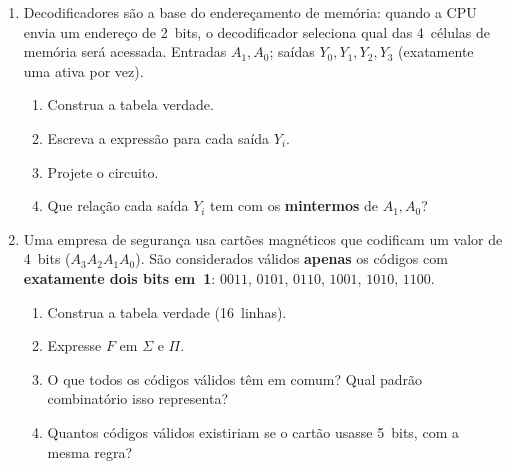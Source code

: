 \documentclass[11pt, a4paper]{article}
\begin{document}
\begin{enumerate}
\item Decodificadores s\~{a}o a base do endere\c{c}amento de mem\'{o}ria: quando a CPU envia um endere\c{c}o de 2~bits, o decodificador seleciona qual das 4~c\'{e}lulas de mem\'{o}ria ser\'{a} acessada. Entradas $A_1, A_0$; sa\'{i}das $Y_0, Y_1, Y_2, Y_3$ (exatamente uma ativa por vez).
\begin{enumerate}
  \item Construa a tabela verdade.
  \item Escreva a express\~{a}o para cada sa\'{i}da $Y_i$.
  \item Projete o circuito.
  \item Que rela\c{c}\~{a}o cada sa\'{i}da $Y_i$ tem com os \textbf{mintermos} de $A_1, A_0$?
\end{enumerate}

\item Uma empresa de seguran\c{c}a usa cart\~{o}es magn\'{e}ticos que codificam um valor de 4~bits ($A_3 A_2 A_1 A_0$). S\~{a}o considerados v\'{a}lidos \textbf{apenas} os c\'{o}digos com \textbf{exatamente dois bits em~1}: $0011$, $0101$, $0110$, $1001$, $1010$, $1100$.
\begin{enumerate}
  \item Construa a tabela verdade (16~linhas).
  \item Expresse $F$ em $\Sigma$ e $\Pi$.
  \item O que todos os c\'{o}digos v\'{a}lidos t\^{e}m em comum? Qual padr\~{a}o combinat\'{o}rio isso representa?
  \item Quantos c\'{o}digos v\'{a}lidos existiriam se o cart\~{a}o usasse 5~bits, com a mesma regra?
\end{enumerate}


\end{enumerate}
\end{document}
